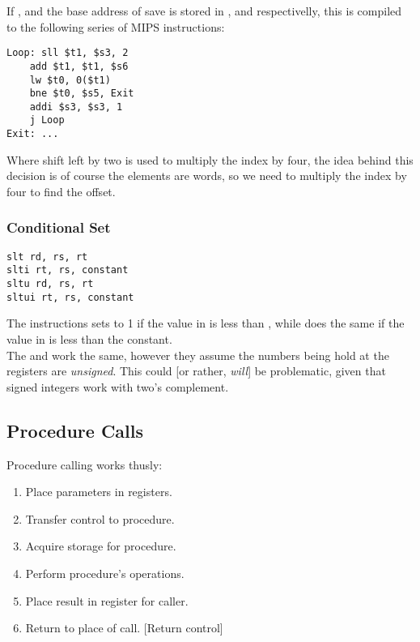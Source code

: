 \documentclass[11pt,a4paper,twocolumn]{book}
\begin{document}
If ,  and the base address of save is stored in ,  and  respectivelly, this is compiled to the following series of MIPS instructions:

\begin{lstlisting}
Loop: sll $t1, $s3, 2
	add $t1, $t1, $s6
	lw $t0, 0($t1)
	bne $t0, $s5, Exit
	addi $s3, $s3, 1
	j Loop
Exit: ...
\end{lstlisting}

Where shift left by two is used to multiply the index by four, the idea behind this decision is of course the elements are words, so we need to multiply the index by four to find the offset.

\subsubsection{Conditional Set}

\begin{lstlisting}
slt rd, rs, rt
slti rt, rs, constant
sltu rd, rs, rt
sltui rt, rs, constant
\end{lstlisting}

The  instructions sets  to 1 if the value in  is less than , while  does the same if the value in  is less than the constant.\\

The  and  work the same, however they assume the numbers being hold at the registers are \textit{unsigned}. This could [or rather, \textit{will}] be problematic, given that signed integers work with two's complement.

\subsection{Procedure Calls}

Procedure calling works thusly:

\begin{enumerate}
\item Place parameters in registers.
\item Transfer control to procedure.
\item Acquire storage for procedure.
\item Perform procedure's operations.
\item Place result in register for caller.
\item Return to place of call. [Return control]
\end{enumerate}
\end{document}
